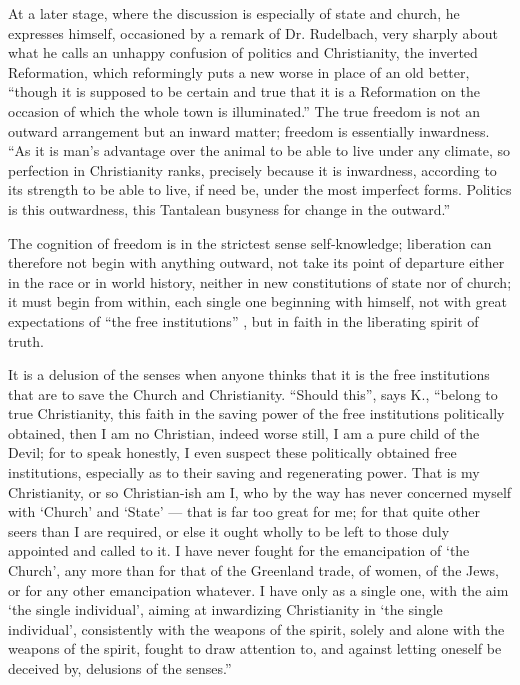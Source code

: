 \documentclass[12pt,a4paper,openany]{book}
\newcommand{\opage}[1]{\marginnote{\footnotesize\textit{[#1]}}}
\begin{document}
At a later stage, where the discussion is especially of
state and church, he expresses himself, occasioned by
a remark of Dr. Rudelbach, very sharply about what
he calls an unhappy confusion of politics and Christianity,
the inverted Reformation, which reformingly puts a
new worse in place of an old better, ``though
it is supposed to be certain and true that it is a Reformation
on the occasion of which the whole town is illuminated.'' The
true freedom is not an outward arrangement but
an inward matter; freedom is essentially inwardness. ``As
it is man's advantage over the animal to be able to live
under any climate, so perfection
in Christianity ranks, precisely because it is inwardness, according to its
strength to be able to live, if need be, under the most imperfect
forms. Politics is this outwardness,
this Tantalean busyness for change in the outward.''

The cognition of freedom is in the strictest sense self-knowledge;
liberation can therefore not begin with
anything outward, not take its point of departure either in
the race or in world history, neither in new constitutions of state nor
of church; it must begin from within,
each single one beginning with himself, not with
great expectations of ``the free institutions'' , but in
faith in the liberating spirit of truth.

It is a delusion of the senses when anyone thinks that it
is the free institutions that are to save the Church and
\setcounter{footnote}{0}%
\opage{6}Christianity. ``Should this'', says K., ``belong to
true Christianity, this faith in the saving power of
the free institutions politically obtained, then I am no
Christian, indeed worse still, I am a pure child of the Devil;
for to speak honestly, I even suspect these politically
obtained free institutions, especially as to their saving
and regenerating power. That is my Christianity,
or so Christian-ish am I, who by the way has never
concerned myself with `Church' and `State' --- that is far
too great for me; for that quite other
seers than I are required, or else it ought wholly to be left to
those duly appointed and called to it. I
have never fought for the emancipation of `the Church', any more
than for that of the Greenland trade, of women, of the Jews,
or for any other emancipation whatever. I have only as
a single one, with the aim `the single individual', aiming at inwardizing
Christianity in `the single individual', consistently with
the weapons of the spirit, solely and alone with the weapons of the spirit,
fought to draw attention to, and against letting
oneself be deceived by, delusions of the senses.''
\end{document}

